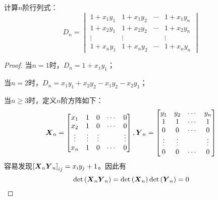 \begin{problem}
计算\(n\)阶行列式：
\begin{equation*}
    D_n=
    \begin{vmatrix}
        1+x_{1}y_{1} & 1+x_{1}y_{2} & \cdots & 1+x_{1}y_{n} \\
        1+x_{2}y_{1} & 1+x_{2}y_{2} & \cdots & 1+x_{2}y_{n} \\
        \vdots       & \vdots       &        & \vdots       \\
        1+x_{n}y_{1} & 1+x_{n}y_{2} & \cdots & 1+x_{n}y_{n}
    \end{vmatrix}
\end{equation*}
\end{problem}
\begin{proof}
    当\(n=1\)时，\(D_n=1+x_1y_1\)；

    当\(n=2\)时，\(D_n=x_1y_1+x_2y_2-x_1y_2-x_2y_1\)；

    当\(n\geq3\)时，定义\(n\)阶方阵如下：
    \begin{equation*}
        \boldsymbol{X}_n=
        \begin{bmatrix}
            x_{1}  & 1      & 0      & \cdots & 0      \\
            x_{2}  & 1      & 0      & \cdots & 0      \\
            \vdots & \vdots & \vdots &        & \vdots \\
            x_{n}  & 1      & 0      & \cdots & 0
        \end{bmatrix},
        \boldsymbol{Y}_n=
        \begin{bmatrix}
            y_{1}  & y_{2}  & \cdots & y_{n}  \\
            1      & 1      & \cdots & 1      \\
            0      & 0      & \cdots & 0      \\
            \vdots & \vdots &        & \vdots \\
            0      & 0      & \cdots & 0
        \end{bmatrix}
    \end{equation*}
    容易发现\(\left[ \boldsymbol{X}_n\boldsymbol{Y}_n \right]_{ij}=x_iy_j+1\)。因此有
    \begin{equation*}
        \mathrm{det}\left( \boldsymbol{X}_n\boldsymbol{Y}_n \right)=\mathrm{det}\left( \boldsymbol{X}_n \right)\mathrm{det}\left( \boldsymbol{Y}_n \right)=0
    \end{equation*}
\end{proof}

